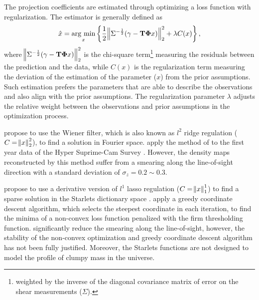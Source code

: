 \documentclass[twocolumn]{aastex62}
\newcommand{\argmin}{\mathop{\rm arg~min}\limits}
\begin{document}
The projection coefficients are estimated through optimizing a loss function with regularization. The estimator is
generally defined as
\begin{equation}
\hat{x}=\argmin_{x} \left\{ \frac{1}{2}\norm{\Sigma^{-\frac{1}{2}}(\gamma- \mathbf{T\Phi} x)}_2^2+ \lambda C(x) \right\},
\end{equation}
where $\norm{\Sigma^{-\frac{1}{2}}(\gamma - \mathbf{T\Phi} x)}_2^2$ is the chi-square term\footnote{weighted by the
inverse of the diagonal covariance matrix of error on the shear measurements ($\Sigma$).} measuring
the residuals between the prediction and the data, while $C(x)$ is the regularization term measuring the deviation of
the estimation of the parameter ($x$) from the prior assumptions. Such estimation prefers the parameters that are able
to describe the observations and also align with the prior assumptions. The regularization parameter $\lambda$ adjusts 
the relative weight between the observations and prior assumptions in the optimization process.

\citet{LSS-massMap-Wiener-Simon2009} propose to use the Wiener filter, which is also known as $l^2$ ridge regulation 
($C=\norm{x}^2_2$), to find a solution in Fourier space. \citet{HSC1-massMaps} apply the method of 
\citet{LSS-massMap-Wiener-Simon2009} to the first year data of the Hyper Suprime-Cam Survey \citep{HSC1-data}. 
However, the density maps reconstructed by this method suffer from a smearing along the line-of-sight direction with 
a standard deviation of $\sigma_z=0.2 \sim 0.3$.

\citet{LSS-massMap-Glimpse3D-Leonard2014} propose to use a derivative version of $l^1$ lasso regulation ($C=\norm{x}^1_1$) 
to find a sparse solution in the Starlets dictionary space \citep{Starlet-Starck2015}. \citet{LSS-massMap-Glimpse3D-Leonard2014}
apply a greedy coordinate descent algorithm, which selects the steepest coordinate in each iteration, to find the minima 
of a non-convex loss function penalized with the firm thresholding function. \citet{LSS-massMap-Glimpse3D-Leonard2014} 
significantly reduce the smearing along the line-of-sight, however, the stability of the non-convex optimization and
greedy coordinate descent algorithm has not been fully justified. Moreover, the Starlets functions are not designed to 
model the profile of clumpy mass in the universe. 
\end{document}
